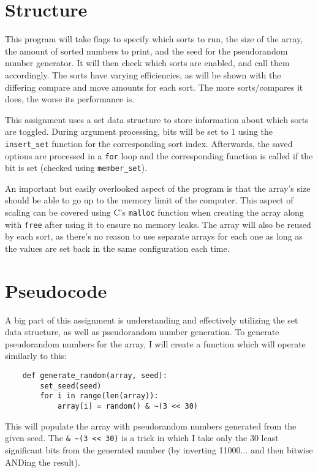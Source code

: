 \documentclass[12pt]{article}
\begin{document}
\section{Structure}

This program will take flags to specify which sorts to run, the size of the array, the amount of sorted numbers to print, and the seed for the pseudorandom number generator. It will then check which sorts are enabled, and call them accordingly. The sorts have varying efficiencies, as will be shown with the differing compare and move amounts for each sort. The more sorts/compares it does, the worse its performance is.

This assignment uses a set data structure to store information about which sorts are toggled. During argument processing, bits will be set to 1 using the \verb|insert_set| function for the corresponding sort index. Afterwards, the saved options are processed in a \verb|for| loop and the corresponding function is called if the bit is set (checked using \verb|member_set|).

An important but easily overlooked aspect of the program is that the array's size should be able to go up to the memory limit of the computer. This aspect of scaling can be covered using C's \verb|malloc| function when creating the array along with \verb|free| after using it to ensure no memory leaks. The array will also be reused by each sort, as there's no reason to use separate arrays for each one as long as the values are set back in the same configuration each time.
\section{Pseudocode}

A big part of this assignment is understanding and effectively utilizing the set data structure, as well as pseudorandom number generation. To generate pseudorandom numbers for the array, I will create a function which will operate similarly to this:
\begin{verbatim}
    def generate_random(array, seed):
        set_seed(seed)
        for i in range(len(array)):
            array[i] = random() & ~(3 << 30)
\end{verbatim}
This will populate the array with pseudorandom numbers generated from the given seed. The \verb|& ~(3 << 30)| is a trick in which I take only the 30 least significant bits from the generated number (by inverting 11000... and then bitwise ANDing the result).
\end{document}
